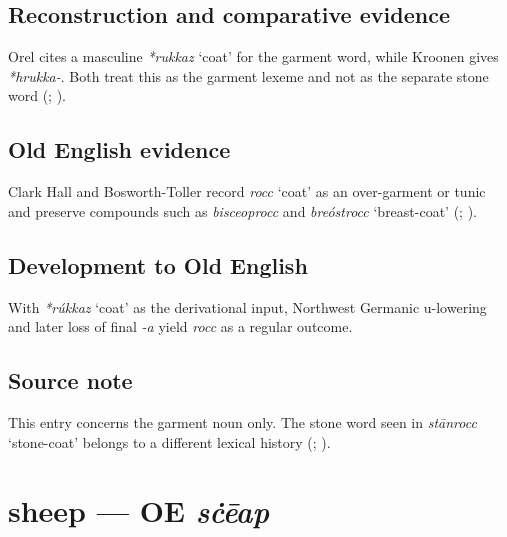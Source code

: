 \documentclass[
  british,
  a4paper,
  openany]{book}
\providecommand{\Recon}[1]{\emph{*#1}}
{\catcode`→=\active \global\def→{\ensuremath{\rightarrow}}}
\providecommand{\texorpdfstring}[2]{#1}
\providecommand{\Recon}[1]{\emph{*#1}}
{\catcode`→=\active \global\def→{\ensuremath{\rightarrow}}}
\begin{document}
\subsection{Reconstruction and comparative
evidence}\label{reconstruction-and-comparative-evidence-42}

Orel cites a masculine \Recon{rukkaz} `coat' for the garment word, while
Kroonen gives \emph{*hrukka-}. Both treat this as the garment lexeme and
not as the separate stone word (;
).

\subsection{Old English evidence}\label{old-english-evidence-42}

Clark Hall and Bosworth-Toller record \emph{rocc} `coat' as an
over-garment or tunic and preserve compounds such as \emph{bisceoprocc}
and \emph{breóstrocc} `breast-coat' (; ).

\subsection{Development to Old
English}\label{development-to-old-english-42}

With \Recon{rúkkaz} `coat' as the derivational input, Northwest Germanic
u-lowering and later loss of final \emph{-a} yield \emph{rocc} as a
regular outcome.

\subsection{Source note}\label{source-note-3}

This entry concerns the garment noun only. The stone word seen in
\emph{stānrocc} `stone-coat' belongs to a different lexical history
(;
).

\section{\texorpdfstring{sheep --- OE
\emph{sċēap}}{sheep --- OE sċēap}}\label{sheep-oe-sux10bux113ap}

\end{document}
